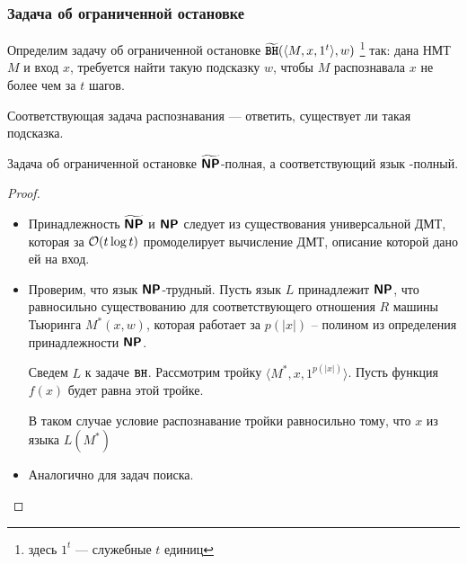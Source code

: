 \subsubsection{Задача об ограниченной остановке}
\begin{defn}[\BH]
	Определим задачу об ограниченной остановке $ \widetilde{{\textbf{\texttt{BH}}}}(\langle M, x, 1^{t} \rangle, w)$ \footnote{здесь $ 1^{t}$ --- служебные $ t$ единиц} так:
	дана НМТ $ M$ и вход $ x$, требуется найти такую подсказку $ w$, чтобы $ M$ распознавала $ x$ не более чем за $ t$ шагов.

	\noindent
	Соответствующая задача распознавания --- ответить, существует ли такая подсказка.
    \end{defn}
\begin{thm}
    Задача об ограниченной остановке $ \widetilde{\textmd{\textbf{\textsf{NP}}}}$-полная, а соответствующий язык \NP-полный.
\end{thm}
\begin{proof}
	\begin{itemize}
		\item Принадлежность $ \widetilde{\textmd{\textbf{\textsf{NP}}}}$ и $ \textmd{\textbf{\textsf{NP}}}$ следует из существования универсальной ДМТ, которая за $ \mathcal{O}(t \log t)$ промоделирует вычисление ДМТ, описание которой дано ей на вход.
		\item Проверим, что язык  $ \textmd{\textbf{\textsf{NP}}}$-трудный.
			Пусть  язык $ L$ принадлежит $ \textmd{\textbf{\textsf{NP}}}$, что равносильно существованию для соответствующего отношения $ R$ машины Тьюринга $ M^{*}(x, w)$, которая работает за $ p(\lvert x \rvert )$ -- полином из определения принадлежности $ \textmd{\textbf{\textsf{NP}}}$.

			Сведем $ L$ к задаче $ {\textbf{\texttt{BH}}}$. Рассмотрим тройку $ \langle M^{*}, x, 1^{p(\lvert x \rvert )} \rangle$. 
			Пусть функция $ f(x)$ будет равна этой тройке.

		  В таком случае условие распознавание тройки равносильно тому, что $ x$ из языка $L(M^*)$
		\item Аналогично для задач поиска.
    \end{itemize}
\end{proof}

